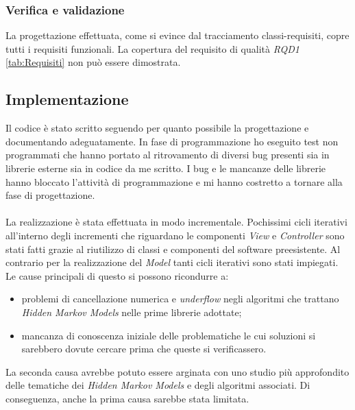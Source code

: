 \subsubsection*{Verifica e validazione}
La progettazione effettuata, come si evince dal tracciamento classi-requisiti, copre tutti i requisiti funzionali. La copertura del requisito di qualità \emph{RQD1} \ref{tab:Requisiti} non può essere dimostrata.
\subsection{Implementazione}
\label{3.4}
Il codice è stato scritto seguendo per quanto possibile la progettazione e documentando adeguatamente. In fase di programmazione ho eseguito test non programmati che hanno portato al ritrovamento di diversi bug presenti sia in librerie esterne sia in codice da me scritto. I bug e le mancanze delle librerie hanno bloccato l'attività di programmazione e mi hanno costretto a tornare alla fase di progettazione.\\\\
La realizzazione è stata effettuata in modo incrementale. Pochissimi cicli iterativi all'interno degli incrementi che riguardano le componenti \emph{View} e \emph{Controller} sono stati fatti grazie al riutilizzo di classi e componenti del software preesistente. Al contrario per la realizzazione del \emph{Model} tanti cicli iterativi sono stati impiegati. Le cause principali di questo si possono ricondurre a:
\begin{itemize}
\item problemi di cancellazione numerica e \emph{underflow} negli algoritmi che trattano \emph{Hidden Markov Models} nelle prime librerie adottate;
\item mancanza di conoscenza iniziale delle problematiche le cui soluzioni si sarebbero dovute cercare prima che queste si verificassero.
\end{itemize}
La seconda causa avrebbe potuto essere arginata con uno studio più approfondito delle tematiche dei \emph{Hidden Markov Models} e degli algoritmi associati. Di conseguenza, anche la prima causa sarebbe stata limitata.
